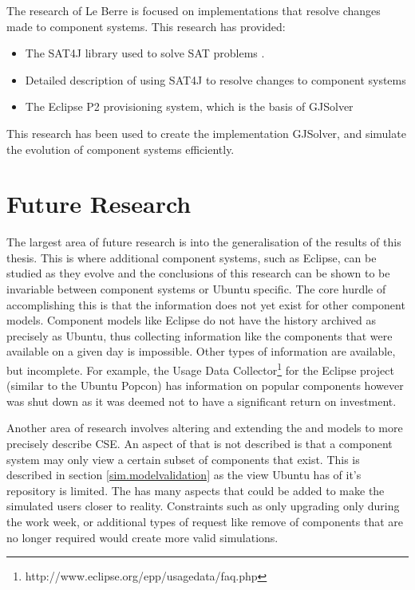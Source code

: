 The research of Le Berre is focused on implementations that resolve changes made to component systems.
This research has provided:
\begin{itemize}
  \item The SAT4J library used to solve SAT problems \citep{le2010sat4j}.
  \item Detailed description of using SAT4J to resolve changes to component systems \citep{le_berre_dependency_2009} \citep{leBerre2010}
  \item The Eclipse P2 provisioning system, which is the basis of GJSolver
\end{itemize}
This research has been used to create the implementation GJSolver, and simulate the evolution of component systems efficiently.

\section{Future Research}
The largest area of future research is into the generalisation of the results of this thesis.
This is where additional component systems, such as Eclipse, 
can be studied as they evolve and the conclusions of this research can be shown to be invariable between component systems or Ubuntu specific.
The core hurdle of accomplishing this is that the information does not yet exist for other component models.
Component models like Eclipse do not have the history archived as precisely as Ubuntu, thus collecting information like the components that were available on a given day is impossible.
Other types of information are available, but incomplete.
For example, the Usage Data Collector\footnote{http://www.eclipse.org/epp/usagedata/faq.php} for the Eclipse project (similar to the Ubuntu Popcon) 
has information on popular components however was shut down as it was deemed not to have a significant return on investment. 

Another area of research involves altering and extending the \modelname and \usermodel models to more precisely describe CSE.
An aspect of \modelname that is not described is that a component system may only view a certain subset of components that exist.
This is described in section \ref{sim.modelvalidation} as the view Ubuntu has of it's repository is limited.
The \usermodel has many aspects that could be added to make the simulated users closer to reality.
Constraints such as only upgrading only during the work week, 
or additional types of request like remove of components that are no longer required would create more valid simulations.

